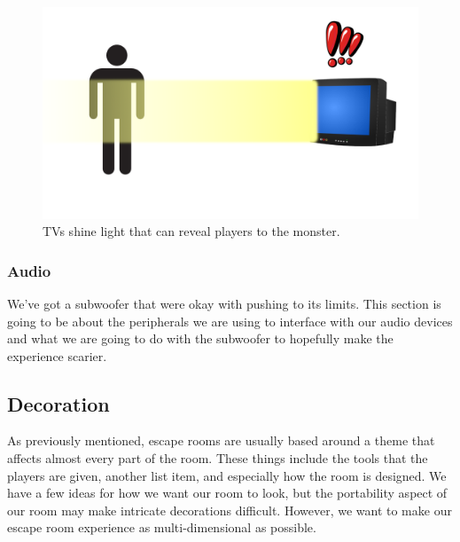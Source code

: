 \documentclass[conference]{IEEEtran}
\begin{document}
\begin{figure}[ht]
    \centering
    \includegraphics[width=0.90\columnwidth]{Images/tvsketch.png}
    \caption{TVs shine light that can reveal players to the monster.}
\end{figure}

\subsubsection*{Audio}
We've got a subwoofer that were okay with pushing to its limits. This section is going to be about the peripherals we are using
to interface with our audio devices and what we are going to do with the subwoofer to hopefully make the experience scarier.

\subsection*{Decoration}
As previously mentioned, escape rooms are usually based around a theme that affects almost
every part of the room. These things include the tools that the players are given, another list item,
and especially how the room is designed. We have a few ideas for how we want our room to look, but
the portability aspect of our room may make intricate decorations difficult. However, we want to make
our escape room experience as multi-dimensional as possible.

\end{document}
